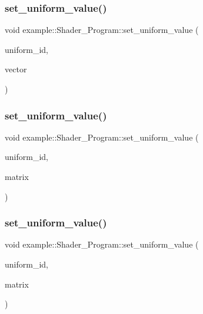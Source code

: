 \mbox{\label{classexample_1_1_shader___program_a2a2c6ff8951da9673abe325af811fafa}} 
\subsubsection{set\_uniform\_value()\hspace{0.1cm}{\footnotesize\ttfamily [5/8]}}
{\footnotesize\ttfamily void example\+::\+Shader\+\_\+\+Program\+::set\+\_\+uniform\+\_\+value (\begin{DoxyParamCaption}\item[{G\+Lint}]{uniform\+\_\+id,  }\item[{const Vector4f \&}]{vector }\end{DoxyParamCaption})\hspace{0.3cm}{\ttfamily [inline]}}

\mbox{\label{classexample_1_1_shader___program_a01a9e5843a65dd8e58f70762970e88c2}} 
\subsubsection{set\_uniform\_value()\hspace{0.1cm}{\footnotesize\ttfamily [6/8]}}
{\footnotesize\ttfamily void example\+::\+Shader\+\_\+\+Program\+::set\+\_\+uniform\+\_\+value (\begin{DoxyParamCaption}\item[{G\+Lint}]{uniform\+\_\+id,  }\item[{const Matrix22f \&}]{matrix }\end{DoxyParamCaption})\hspace{0.3cm}{\ttfamily [inline]}}

\mbox{\label{classexample_1_1_shader___program_aff80e9ffddea9450a6f79320ac53e085}} 
\subsubsection{set\_uniform\_value()\hspace{0.1cm}{\footnotesize\ttfamily [7/8]}}
{\footnotesize\ttfamily void example\+::\+Shader\+\_\+\+Program\+::set\+\_\+uniform\+\_\+value (\begin{DoxyParamCaption}\item[{G\+Lint}]{uniform\+\_\+id,  }\item[{const Matrix33f \&}]{matrix }\end{DoxyParamCaption})\hspace{0.3cm}{\ttfamily [inline]}}

